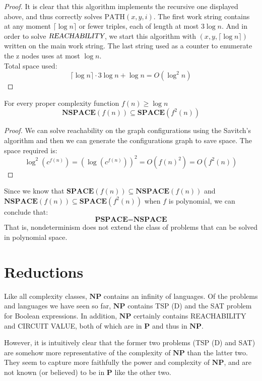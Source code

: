 \documentclass[12pt]{article}
\begin{document}
\begin{proof}
It is clear that this algorithm implements the recursive one displayed above, and thus correctly solves $\mathrm{PATH}(x, y, i)$. The first work string contains at any moment $\lceil \log n \rceil$ or fewer triples, each of length at most $3 \log n$. And in order to solve $\textsl{REACHABILITY}$, we start this algorithm with $(x, y, \lceil \log n \rceil)$ written on the main work string. The last string used as a counter to enumerate the z nodes uses at most $\log n$.\\
Total space used: $$\lceil \log n \rceil\cdot 3\log n+\log n = O(\log^2n)$$
\end{proof}
\begin{defbox}[Corollary]
  For every proper complexity function $f(n)\ge\log n$
  $$\textbf{NSPACE}(f(n))\subseteq\textbf{SPACE}(f^2(n))$$
\end{defbox}
\begin{proof}
  We can solve reachability on the graph configurations using the Savitch's algorithm and then we can generate the configurations graph to save space. The space required is:
  $$\log^2(c^{f(n)})=(\log(c^{f(n)}))^2=O(f(n)^2)=O(f^2(n))$$
\end{proof}
\begin{defbox}[Corollary]
  Since we know that $\textbf{SPACE}(f(n))\subseteq\textbf{NSPACE}(f(n))$ and $\textbf{NSPACE}(f(n))\subseteq\textbf{SPACE}(f^2(n))$ when $f$ is polynomial, we can conclude that:
  $$\textbf{PSPACE}=\textbf{NSPACE}$$
  That is, nondeterminism does not extend the class of problems that can be solved in polynomial space.
\end{defbox}

\section{Reductions}
Like all complexity classes, $\mathbf{NP}$ contains an infinity of languages. Of the problems and languages we have seen so far, $\mathbf{NP}$ contains \textsc{TSP (D)} and the \textsc{SAT} problem for Boolean expressions. In addition, $\mathbf{NP}$ certainly contains \textsc{REACHABILITY} and \textsc{CIRCUIT VALUE}, both of which are in $\mathbf{P}$ and thus in $\mathbf{NP}$.

However, it is intuitively clear that the former two problems (\textsc{TSP (D)} and \textsc{SAT}) are somehow more representative of the complexity of $\mathbf{NP}$ than the latter two. They seem to capture more faithfully the power and complexity of $\mathbf{NP}$, and are not known (or believed) to be in $\mathbf{P}$ like the other two.
\end{document}
